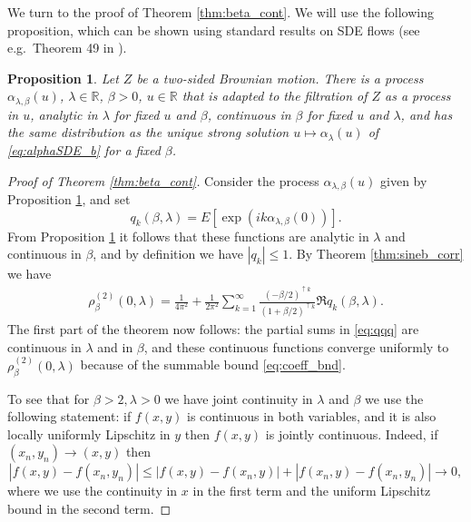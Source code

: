 \documentclass[12pt]{article}
\newtheorem{proposition}[theorem]{Proposition}
\theoremstyle{definition} %
\newcommand{\R}{{\mathbb R}}
\theoremstyle{remark} %
\begin{document}
We turn to the proof of Theorem \ref{thm:beta_cont}. We will use the following proposition, which can be shown using standard results on SDE flows (see e.g.~Theorem 49 in \cite{Protter}).

\begin{proposition}\label{prop:sde_cont}
Let $Z$ be a two-sided Brownian motion.
There is a process $\alpha_{\lambda,\beta}(u)$, $\lambda\in \R$, $\beta>0$, $u\in \R$ that is adapted to the filtration of $Z$ as a process in $u$, analytic in $\lambda$ for fixed $u$ and  $\beta$, continuous in  $\beta$ for fixed $u$ and $\lambda$, and has the same distribution as the unique strong solution $u\mapsto \alpha_{\lambda}(u)$ of  \eqref{eq:alphaSDE_b} for a fixed $\beta$.     
\end{proposition}

\begin{proof}[Proof of Theorem \ref{thm:beta_cont}]
Consider the process $\alpha_{\lambda,\beta}(u)$ given by  Proposition \ref{prop:sde_cont}, and set
\[
q_k(\beta,\lambda)=E [\exp(i k \alpha_{\lambda,\beta}(0))].
\]
From Proposition \ref{prop:sde_cont} it follows that these functions are analytic in $\lambda$ and continuous in $\beta$, and by definition we have $|q_k|\le 1$.  By Theorem \ref{thm:sineb_corr} we have
\begin{align}\label{eq:qqq}
    \rho_\beta^{(2)}(0,\lambda)=\frac{1}{4\pi^2}+\frac{1}{2\pi^2}\sum_{k=1}^\infty  \frac{(-\beta/2)^{\uparrow k}}{(1+\beta/2)^{\uparrow k}} \Re q_k(\beta,\lambda).
\end{align}
The first part of the theorem now follows:  the partial sums in \eqref{eq:qqq} are continuous in $\lambda$ and in $\beta$, and these continuous functions converge uniformly to  $\rho_\beta^{(2)}(0,\lambda)$ because of the summable bound \eqref{eq:coeff_bnd}.


To see that for $\beta> 2, \lambda>0$ we have joint continuity in $\lambda$ and $\beta$ we use the following statement: if $f(x,y)$ is continuous in both variables, and it is also locally uniformly Lipschitz in $y$ then $f(x,y)$ is jointly continuous. Indeed, if $(x_n,y_n)\to (x,y)$ then 
\[
|f(x,y)-f(x_n, y_n)|\le |f(x,y)-f(x_n,y)|+|f(x_n,y)-f(x_n,y_n)|\to 0,
\]
where we use the continuity in $x$ in the first term and the uniform Lipschitz bound in the 
second term. 



\end{proof}
\end{document}
